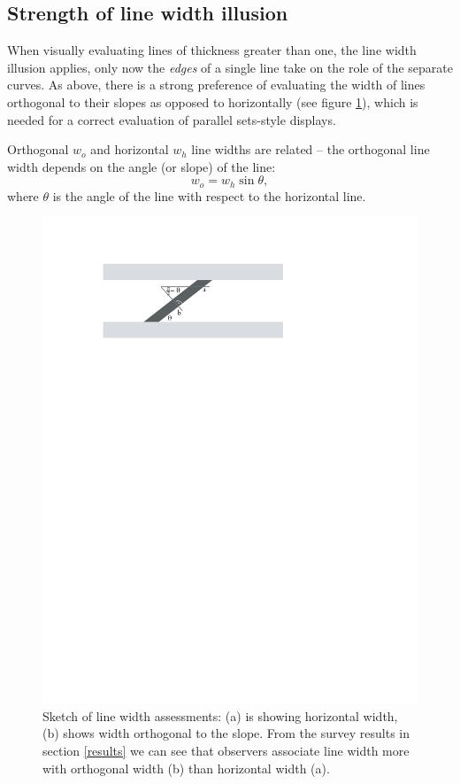 %
\subsection{Strength of  line width illusion}\label{distortion}

When visually evaluating lines of thickness greater than one, the line width illusion applies, only now the {\it edges} of a single line  take on the role of the separate curves. %
As above, there is a strong preference of evaluating the width of lines orthogonal to their slopes as opposed to horizontally (see figure \ref{fig:linewidth}), which is needed for a correct  evaluation of parallel sets-style displays.

Orthogonal $w_o$ and horizontal $w_h$ line widths are related -- the orthogonal line width depends on the angle (or slope) of the line:
\begin{equation}\label{adjust}
w_o = w_h \sin \theta,
\end{equation}
where $\theta$ is the angle of the line with respect to the horizontal line.

\begin{figure}[htbp]
\begin{center}
\includegraphics[width=0.6\linewidth]{images/linewidth}
\end{center}
\caption{\label{fig:linewidth}Sketch of line width assessments: (a) is showing  horizontal width, (b) shows  width orthogonal to the slope. From the survey results in section \ref{results} we can see that  observers associate line width more with  orthogonal width (b) than horizontal width (a).}
\end{figure}



